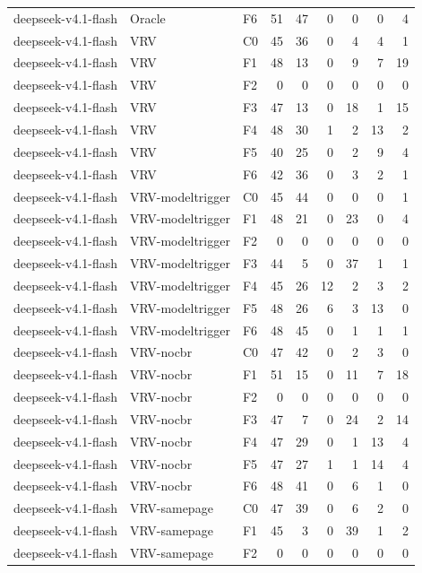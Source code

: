 \begin{tabular}{lllrrrrrr}
deepseek-v4.1-flash & Oracle & F6 & 51 & 47 & 0 & 0 & 0 & 4 \\
deepseek-v4.1-flash & VRV & C0 & 45 & 36 & 0 & 4 & 4 & 1 \\
deepseek-v4.1-flash & VRV & F1 & 48 & 13 & 0 & 9 & 7 & 19 \\
deepseek-v4.1-flash & VRV & F2 & 0 & 0 & 0 & 0 & 0 & 0 \\
deepseek-v4.1-flash & VRV & F3 & 47 & 13 & 0 & 18 & 1 & 15 \\
deepseek-v4.1-flash & VRV & F4 & 48 & 30 & 1 & 2 & 13 & 2 \\
deepseek-v4.1-flash & VRV & F5 & 40 & 25 & 0 & 2 & 9 & 4 \\
deepseek-v4.1-flash & VRV & F6 & 42 & 36 & 0 & 3 & 2 & 1 \\
deepseek-v4.1-flash & VRV-modeltrigger & C0 & 45 & 44 & 0 & 0 & 0 & 1 \\
deepseek-v4.1-flash & VRV-modeltrigger & F1 & 48 & 21 & 0 & 23 & 0 & 4 \\
deepseek-v4.1-flash & VRV-modeltrigger & F2 & 0 & 0 & 0 & 0 & 0 & 0 \\
deepseek-v4.1-flash & VRV-modeltrigger & F3 & 44 & 5 & 0 & 37 & 1 & 1 \\
deepseek-v4.1-flash & VRV-modeltrigger & F4 & 45 & 26 & 12 & 2 & 3 & 2 \\
deepseek-v4.1-flash & VRV-modeltrigger & F5 & 48 & 26 & 6 & 3 & 13 & 0 \\
deepseek-v4.1-flash & VRV-modeltrigger & F6 & 48 & 45 & 0 & 1 & 1 & 1 \\
deepseek-v4.1-flash & VRV-nocbr & C0 & 47 & 42 & 0 & 2 & 3 & 0 \\
deepseek-v4.1-flash & VRV-nocbr & F1 & 51 & 15 & 0 & 11 & 7 & 18 \\
deepseek-v4.1-flash & VRV-nocbr & F2 & 0 & 0 & 0 & 0 & 0 & 0 \\
deepseek-v4.1-flash & VRV-nocbr & F3 & 47 & 7 & 0 & 24 & 2 & 14 \\
deepseek-v4.1-flash & VRV-nocbr & F4 & 47 & 29 & 0 & 1 & 13 & 4 \\
deepseek-v4.1-flash & VRV-nocbr & F5 & 47 & 27 & 1 & 1 & 14 & 4 \\
deepseek-v4.1-flash & VRV-nocbr & F6 & 48 & 41 & 0 & 6 & 1 & 0 \\
deepseek-v4.1-flash & VRV-samepage & C0 & 47 & 39 & 0 & 6 & 2 & 0 \\
deepseek-v4.1-flash & VRV-samepage & F1 & 45 & 3 & 0 & 39 & 1 & 2 \\
deepseek-v4.1-flash & VRV-samepage & F2 & 0 & 0 & 0 & 0 & 0 & 0 \\

\end{tabular}
